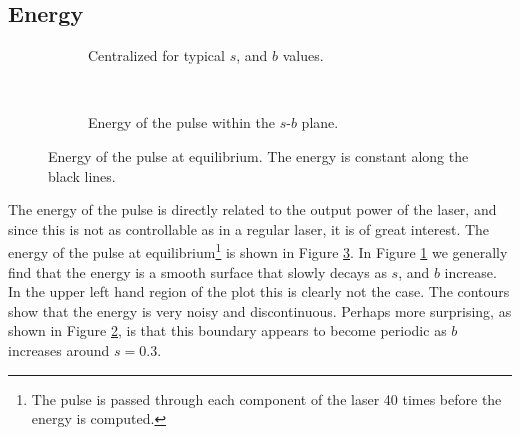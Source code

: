 \subsection{Energy}
\label{chap:energy}

\begin{figure}[p]
\centering
\begin{subfigure}{\textwidth}

\caption{Centralized for typical $s$, and $b$ values.}
\label{fig:energyzoom}
\end{subfigure} \\
\begin{subfigure}{\textwidth}

\caption{Energy of the pulse within the $s$-$b$ plane.}
\label{fig:energybig}
\end{subfigure}
\caption[Energy of the pulse at equilibrium.]{Energy of the pulse at equilibrium. The energy is constant along the black lines.}
\label{fig:energy}
\end{figure}

The energy of the pulse is directly related to the output power of the laser, and since this is not as controllable as in a regular laser, it is of great interest. The energy of the pulse at equilibrium\footnote{The pulse is passed through each component of the laser 40 times before the energy is computed.} is shown in Figure \ref{fig:energy}. In Figure \ref{fig:energyzoom} we generally find that the energy is a smooth surface that slowly decays as $s$, and $b$ increase. In the upper left hand region of the plot this is clearly not the case. The contours show that the energy is very noisy and discontinuous. Perhaps more surprising, as shown in Figure \ref{fig:energybig}, is that this boundary appears to become periodic as $b$ increases around $s = 0.3$. \\


